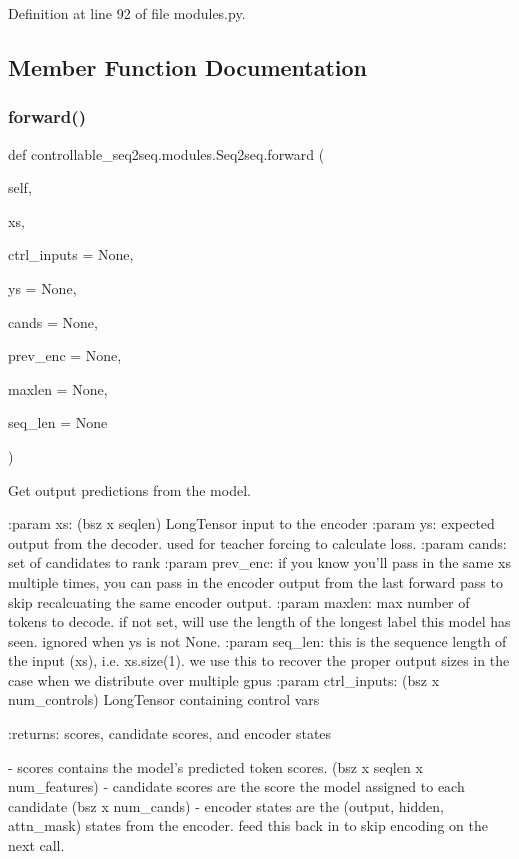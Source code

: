 Definition at line 92 of file modules.\+py.



\subsection{Member Function Documentation}
\mbox{\label{classcontrollable__seq2seq_1_1modules_1_1Seq2seq_a024903e38d40e82ab471528d94afcd5c}} 
\subsubsection{\texorpdfstring{forward()}{forward()}}
{\footnotesize\ttfamily def controllable\+\_\+seq2seq.\+modules.\+Seq2seq.\+forward (\begin{DoxyParamCaption}\item[{}]{self,  }\item[{}]{xs,  }\item[{}]{ctrl\+\_\+inputs = {\ttfamily None},  }\item[{}]{ys = {\ttfamily None},  }\item[{}]{cands = {\ttfamily None},  }\item[{}]{prev\+\_\+enc = {\ttfamily None},  }\item[{}]{maxlen = {\ttfamily None},  }\item[{}]{seq\+\_\+len = {\ttfamily None} }\end{DoxyParamCaption})}

\begin{DoxyVerb}Get output predictions from the model.

:param xs:
    (bsz x seqlen) LongTensor input to the encoder
:param ys:
    expected output from the decoder. used for teacher forcing
    to calculate loss.
:param cands:
    set of candidates to rank
:param prev_enc:
    if you know you'll pass in the same xs multiple times, you can pass
    in the encoder output from the last forward pass to skip
    recalcuating the same encoder output.
:param maxlen:
    max number of tokens to decode. if not set, will use the length of
    the longest label this model has seen. ignored when ys is not None.
:param seq_len:
    this is the sequence length of the input (xs), i.e. xs.size(1). we
    use this to recover the proper output sizes in the case when we
    distribute over multiple gpus
:param ctrl_inputs:
    (bsz x num_controls) LongTensor containing control vars

:returns:
    scores, candidate scores, and encoder states

    - scores contains the model's predicted token scores.
      (bsz x seqlen x num_features)
    - candidate scores are the score the model assigned to each candidate
      (bsz x num_cands)
    - encoder states are the (output, hidden, attn_mask) states from the
      encoder. feed this back in to skip encoding on the next call.
\end{DoxyVerb}
 

